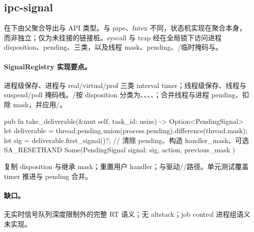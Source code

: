 
\subsection{ipc-signal}

在下由父聚合导出与 API 类型。与 pipe、futex 不同，状态机实现在聚合本身，而非独立；仅为未挂接的链接桩。syscall 与 trap 经在全局锁下访问进程 disposition、pending、三类，以及线程 mask、pending、/临时掩码与。




\paragraph{SignalRegistry 实现要点。}
进程级保存、进程与 real/virtual/prof 三类 interval timer；线程级保存、线程与 suspend/poll 掩码栈。/按 disposition 分类为、、、、；合并线程与进程 pending、扣除 mask，并应用/。

\begin{rustcode}
pub fn take_deliverable(&mut self, task_id: usize) -> Option<PendingSignal> {
    let deliverable = thread.pending.union(process.pending).difference(thread.mask);
    let sig = deliverable.first_signal()?;
    // 清除 pending、构造 handler_mask、可选 SA_RESETHAND
    Some(PendingSignal { signal: sig, action, previous_mask })
}
\end{rustcode}

复制 disposition 与继承 mask；重置用户 handler；与驱动//路径。单元测试覆盖 timer 推进与 pending 合并。

\paragraph{缺口。}
无实时信号队列深度限制外的完整 RT 语义；无 altstack；job control 进程组语义未实现。
